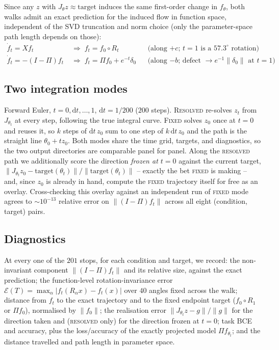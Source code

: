 Since any $z$ with $J_\theta z\approx\text{target}$ induces the same
first-order change in $f_\theta$, both walks admit an exact prediction for
the induced flow in function space, independent of the SVD truncation and
norm choice (only the parameter-space path length depends on those):
\begin{align}
  \dot f_t = Xf_t &\;\Longrightarrow\; f_t = f_0\circ R_t
  &&\text{(along $+c$; $t=1$ is a $57.3^\circ$ rotation)} \label{eq:app-c-flow}\\
  \dot f_t = -(I-\Pi)f_t &\;\Longrightarrow\; f_t = \Pi f_0+e^{-t}\delta_0
  &&\text{(along $-b$; defect $\to e^{-1}\lVert\delta_0\rVert$ at $t=1$)} \label{eq:app-b-flow}
\end{align}

\subsection{Two integration modes}

Forward Euler, $t=0,\mathrm{d}t,\dots,1$, $\mathrm{d}t=1/200$ ($200$ steps).
\textsc{Resolved} re-solves $z_t$ from $J_{\theta_t}$ at every step, following
the true integral curve. \textsc{Fixed} solves $z_0$ once at $t=0$ and reuses
it, so $k$ steps of $\mathrm{d}t\,z_0$ sum to one step of $k\,\mathrm{d}t\,z_0$
and the path is the straight line $\theta_0+t z_0$. Both modes share the time
grid, targets, and diagnostics, so the two output directories are comparable
panel for panel. Along the \textsc{resolved} path we additionally score the
direction \emph{frozen at $t=0$} against the current target,
$\lVert J_{\theta_t}z_0-\text{target}(\theta_t)\rVert /
\lVert\text{target}(\theta_t)\rVert$ -- exactly the bet \textsc{fixed} is
making -- and, since $z_0$ is already in hand, compute the \textsc{fixed}
trajectory itself for free as an overlay. Cross-checking this overlay against
an independent run of \textsc{fixed} mode agrees to $\sim10^{-13}$ relative
error on $\lVert(I-\Pi)f_t\rVert$ across all eight (condition, target) pairs.

\subsection{Diagnostics}

At every one of the $201$ stops, for each condition and target, we record:
the non-invariant component $\lVert(I-\Pi)f_t\rVert$ and its relative size,
against the exact prediction; the function-level rotation-invariance error
$\mathcal{E}(T)=\max_\alpha\lvert f_t(R_\alpha x)-f_t(x)\rvert$ over $40$
angles fixed across the walk; distance from $f_t$ to the exact trajectory and
to the fixed endpoint target ($f_0\circ R_1$ or $\Pi f_0$), normalised by
$\lVert f_0\rVert$; the realisation error $\lVert J_{\theta_t}z-g\rVert/
\lVert g\rVert$ for the direction taken and (\textsc{resolved} only) for the
direction frozen at $t=0$; task BCE and accuracy, plus the loss/accuracy of
the exactly projected model $\Pi f_{\theta_t}$; and the distance travelled and
path length in parameter space.

